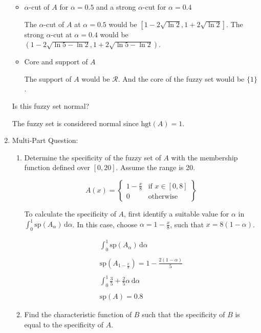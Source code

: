 \documentclass{article}
\begin{document}
\begin{enumerate}
\begin{itemize}
		\item $\alpha$-cut of $A$ for $\alpha = 0.5$ and a strong $\alpha$-cut for $\alpha = 0.4$

		The $\alpha$-cut of $A$ at $\alpha = 0.5$ would be $[1 - 2\sqrt{\ln2}, 1 + 2\sqrt{\ln2}]$. The strong $\alpha$-cut at $\alpha = 0.4$ would be $(1 - 2\sqrt{\ln5 -\ln2}, 1 + 2\sqrt{\ln5 -\ln2})$.

		\item Core and support of $A$
		
		The support of $A$ would be $\mathcal{R}$. And the core of the fuzzy set would be $\{1\}$.
		
	\end{itemize}
	
	Is this fuzzy set normal?
	
	The fuzzy set is considered normal since $\text{hgt}(A)=1$.
	
	\item Multi-Part Question:
	
	\begin{enumerate}
		\item Determine the specificity of the fuzzy set of $A$ with the membership function defined over $[0, 20]$. Assume the range is 20.

		\[
			A(x) = \left\{ \begin{matrix}
				1 - \frac x 8 & \text{if } x \in [0, 8] \\
				0 & \text{otherwise} 
			\end{matrix} \right\}
		\]
		
		To calculate the specificity of $A$, first identify a suitable value for $\alpha$ in $\int_0^1 \text{sp}(A_\alpha) \, \text{d}\alpha$. In this case, choose $\alpha = 1 - \frac x 8$, such that $x= 8(1 -\alpha)$.
		
		\[
		\begin{matrix}
			\int_0^1 \text{sp}(A_\alpha) \, \text{d} \alpha \\
			\\
			\text{sp}(A_{1 - \frac x 8}) = 1 - \frac{2(1 - \alpha)}{5}\\
			\\
			\int_0^1 \frac 3 5 + \frac 2 5 \alpha \, \text{d} \alpha\\
			\\
			\text{sp}(A) = 0.8
		\end{matrix}
		\]
		
		\item Find the characteristic function of $B$ such that the specificity of $B$ is equal to the specificity of $A$.


\end{enumerate}
\end{enumerate}
\end{document}
